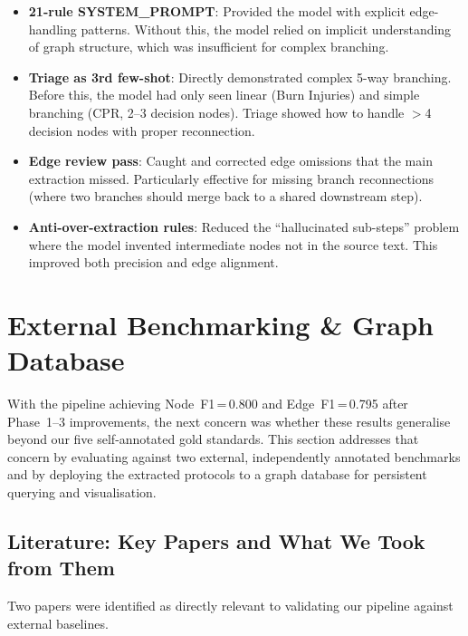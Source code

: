 \documentclass[12pt,a4paper]{article}
\begin{document}
\begin{itemize}[leftmargin=2em]
    \item \textbf{21-rule SYSTEM\_PROMPT}: Provided the model with explicit edge-handling patterns. Without this, the model relied on implicit understanding of graph structure, which was insufficient for complex branching.
    \item \textbf{Triage as 3rd few-shot}: Directly demonstrated complex 5-way branching. Before this, the model had only seen linear (Burn Injuries) and simple branching (CPR, 2--3 decision nodes). Triage showed how to handle $>$4 decision nodes with proper reconnection.
    \item \textbf{Edge review pass}: Caught and corrected edge omissions that the main extraction missed. Particularly effective for missing branch reconnections (where two branches should merge back to a shared downstream step).
    \item \textbf{Anti-over-extraction rules}: Reduced the ``hallucinated sub-steps'' problem where the model invented intermediate nodes not in the source text. This improved both precision and edge alignment.
\end{itemize}


\section{External Benchmarking \& Graph Database}
\label{sec:week-external-benchmarking}

With the pipeline achieving Node~F1\,=\,0.800 and Edge~F1\,=\,0.795 after Phase~1--3 improvements, the next concern was whether these results generalise beyond our five self-annotated gold standards. This section addresses that concern by evaluating against two external, independently annotated benchmarks and by deploying the extracted protocols to a graph database for persistent querying and visualisation.

\subsection{Literature: Key Papers and What We Took from Them}
\label{sec:papers}

Two papers were identified as directly relevant to validating our pipeline against external baselines.
\end{document}
